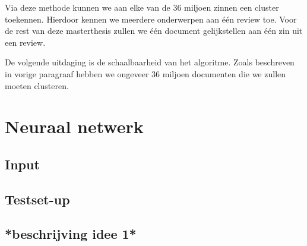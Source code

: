 Via deze methode kunnen we aan elke van de 36 miljoen zinnen een cluster toekennen. Hierdoor kennen we meerdere onderwerpen aan één review toe. Voor de rest van deze masterthesis zullen we één document gelijkstellen aan één zin uit een review.

De volgende uitdaging is de schaalbaarheid van het algoritme. Zoals beschreven in vorige paragraaf hebben we ongeveer 36 miljoen documenten die we zullen moeten clusteren.






\section{Neuraal netwerk}
\label{sec:chapt4_neuraal_netwerk}
\subsection{Input}
\subsection{Testset-up}
\subsection{*beschrijving idee 1*}
